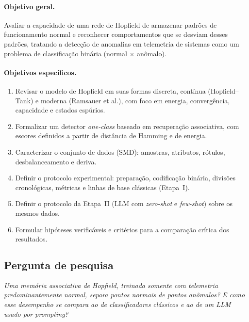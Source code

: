 \paragraph{Objetivo geral.} Avaliar a capacidade de uma rede de Hopfield de armazenar padrões de
funcionamento normal e reconhecer comportamentos que se desviam desses padrões, tratando a detecção de
anomalias em telemetria de sistemas como um problema de classificação binária (normal $\times$ anômalo).

\paragraph{Objetivos específicos.}
\begin{enumerate}
  \item Revisar o modelo de Hopfield em suas formas discreta, contínua (Hopfield--Tank) e moderna
        (Ramsauer et al.), com foco em energia, convergência, capacidade e estados espúrios.
  \item Formalizar um detector \emph{one-class} baseado em recuperação associativa, com escores definidos a
        partir de distância de Hamming e de energia.
  \item Caracterizar o conjunto de dados (SMD): amostras, atributos, rótulos, desbalanceamento e deriva.
  \item Definir o protocolo experimental: preparação, codificação binária, divisões cronológicas, métricas
        e linhas de base clássicas (Etapa~I).
  \item Definir o protocolo da Etapa~II (LLM com \emph{zero-shot} e \emph{few-shot}) sobre os mesmos dados.
  \item Formular hipóteses verificáveis e critérios para a comparação crítica dos resultados.
\end{enumerate}

\subsection{Pergunta de pesquisa}
\emph{Uma memória associativa de Hopfield, treinada somente com telemetria predominantemente normal,
separa pontos normais de pontos anômalos? E como esse desempenho se compara ao de classificadores clássicos
e ao de um LLM usado por \emph{prompting}?}

